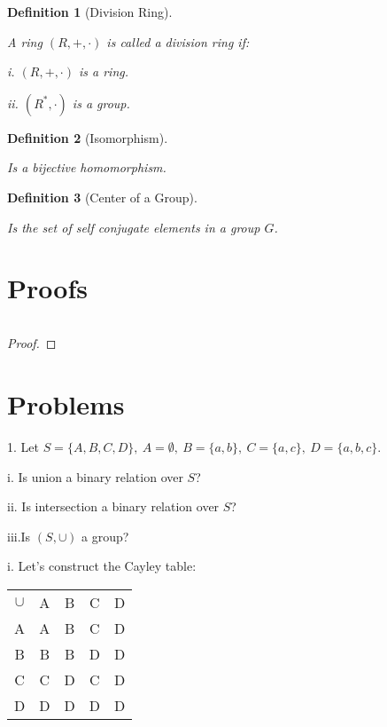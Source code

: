 \documentclass{article}
\newenvironment{customthm}[1]
  {\renewcommand\theinnercustomthm{#1}\innercustomthm}
  {\endinnercustomthm}
\newtheorem{definition}{Definition}
\begin{document}
\begin{definition}[Division Ring]
  $ $
  
  A ring $(R, +, \cdot)$ is called a division ring if:

  \qquad i. $(R, +, \cdot)$ is a ring.

  \qquad ii. $(R^*, \cdot)$ is a group.
  
\end{definition}


\begin{definition}[Isomorphism]
  $ $

  Is a bijective homomorphism.
  
\end{definition}

\begin{definition}[Center of a Group]
  $ $
  
  Is the set of self conjugate elements in a group $G$.
  
\end{definition}

\newpage

\section*{Proofs}

\begin{customthm}{1}[2023.S(1.A.i)]
  $ $

  

\end{customthm}

\begin{proof}
  
\end{proof}
\newpage


\section*{Problems}
1. 
Let $S = \{ A, B, C, D\}, \ A=\emptyset, \ B=\{a,b\}, \ C=\{a,c\}, \ D=\{a,b,c\}$.

i. Is union a binary relation over $S$?

ii. Is intersection a binary relation over $S$?

iii.Is $(S, \cup)$ a group?
\newline

\noindent
{}

i. Let's construct the Cayley table:

\begin{center}
  \begin{tabular}{c | c c c c}
    $\cup$ & A & B & C & D \\
    \cline{1-5}
    A & A & B & C & D \\
    B & B & B & D & D \\
    C & C & D & C & D \\
    D & D & D & D & D \\
  \end{tabular}
\end{center}
\end{document}
